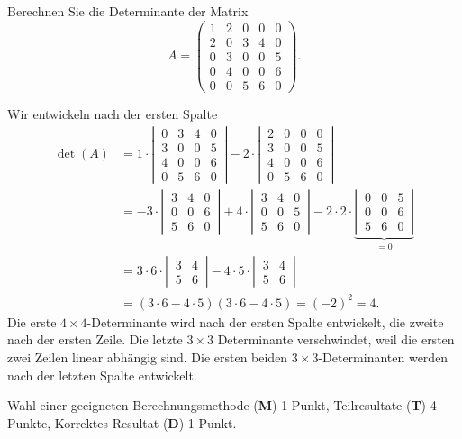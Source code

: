 Berechnen Sie die Determinante der Matrix
\[
A=\begin{pmatrix}
1&2&0&0&0\\
2&0&3&4&0\\
0&3&0&0&5\\
0&4&0&0&6\\
0&0&5&6&0
\end{pmatrix}.
\]

\begin{loesung}
Wir entwickeln nach der ersten Spalte
\begin{align*}
\det(A)
&=
1\cdot
\left|\,\begin{matrix}
0&3&4&0\\
3&0&0&5\\
4&0&0&6\\
0&5&6&0
\end{matrix}\,\right|
-2\cdot
\left|\,\begin{matrix}
2&0&0&0\\
3&0&0&5\\
4&0&0&6\\
0&5&6&0
\end{matrix}\,\right|
\\
&=
-3\cdot
\left|\,\begin{matrix}
3&4&0\\
0&0&6\\
5&6&0
\end{matrix}\,\right|
+4\cdot
\left|\,\begin{matrix}
3&4&0\\
0&0&5\\
5&6&0
\end{matrix}\,\right|
-2\cdot
2\cdot
\underbrace{
\left|\,\begin{matrix}
0&0&5\\
0&0&6\\
5&6&0
\end{matrix}\,\right|
}_{\displaystyle =0}
\\
&=
3\cdot6\cdot
\left|\,\begin{matrix}
3&4\\
5&6
\end{matrix}\,\right|
-4\cdot 5\cdot
\left|\,\begin{matrix}
3&4\\
5&6
\end{matrix}\,\right|
\\
&=(3\cdot 6-4\cdot 5)(3\cdot 6-4\cdot 5)=(-2)^2=4.
\end{align*}
Die erste $4\times 4$-Determinante wird nach der ersten Spalte entwickelt,
die zweite nach der ersten Zeile.
Die letzte $3\times 3$ Determinante verschwindet, weil die
ersten zwei Zeilen linear abhängig sind.
Die ersten beiden $3\times 3$-Determinanten werden nach der letzten Spalte entwickelt.
\qedhere
\end{loesung}


\begin{bewertung}
Wahl einer geeigneten Berechnungsmethode ({\bf M}) 1 Punkt,
Teilresultate ({\bf T}) 4 Punkte,
Korrektes Resultat ({\bf D}) 1 Punkt.
\end{bewertung}
